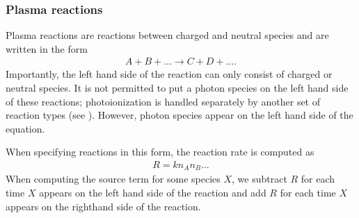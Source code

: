 \documentclass[letterpaper,10pt,english]{sphinxmanual}
\begin{document}
\begin{sphinxVerbatim}[commandchars=\\\{\},formatcom=\scriptsize]
   \PYG{p}{[}
        
        
        
          
          
        
        
   \PYG{p}{]}
\end{sphinxVerbatim}


\subsubsection{Plasma reactions}
\label{\detokenize{Applications/CdrPlasmaModel:plasma-reactions}}\label{\detokenize{Applications/CdrPlasmaModel:chap-cdrplasmareactionsjson}}
Plasma reactions are reactions between charged and neutral species and are written in the form
\begin{equation*}
\begin{split}A + B + \ldots \rightarrow C + D + \ldots.\end{split}
\end{equation*}
Importantly, the left hand side of the reaction can only consist of charged or neutral species.
It is not permitted to put a photon species on the left hand side of these reactions; photo\sphinxhyphen{}ionization is handled separately by another set of reaction types (see {\hyperref[\detokenize{Applications/CdrPlasmaModel:chap-photoreactionsjson}]{}}).
However, photon species  appear on the left hand side of the equation.

When specifying reactions in this form, the reaction rate is computed as
\begin{equation*}
\begin{split}R = k n_A n_B\ldots\end{split}
\end{equation*}
When computing the source term for some species \(X\), we subtract \(R\) for each time \(X\) appears on the left hand side of the reaction and add \(R\) for each time \(X\) appears on the right\sphinxhyphen{}hand side of the reaction.
\end{document}
